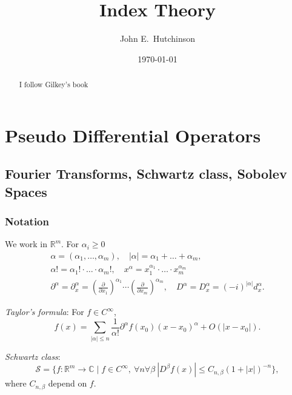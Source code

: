 \documentclass[a4paper]{amsbook}
\theoremstyle{plain}
\theoremstyle{definition}
\theoremstyle{remark}
\begin{document}
\title{Index Theory}  
\author{John E.\ Hutchinson}
\date{\today}

 \begin{abstract}
  I follow Gilkey's book
 \end{abstract}

\maketitle



\tableofcontents

\chapter{Pseudo Differential Operators}
\section{\textbf{Fourier Transforms, Schwartz class, Sobolev Spaces}} 

 \subsection{Notation}  We work in $  \mathbb{R}^m$.  For $ \alpha_i \geq 0 $ 
  \begin{gather*}
  \alpha  = (\alpha_1,\dots, \alpha_m )   , \quad 
  | \alpha |   = \alpha_1+ \dots + \alpha _m, \\ 
  \alpha !  = \alpha _1 ! \cdot \dots\cdot  \alpha _m ! , \quad 
  x^ \alpha  = x_1^{\alpha _1} \cdot \dots \cdot x_m ^ {\alpha _m} \\
  \partial^ \alpha = \partial_x^ \alpha 
     = \left( \frac{\partial}{\partial x_1}\right)^{\alpha_1}\cdots   \left( \frac{\partial}{\partial x_m}\right)^{\alpha_m} , \quad 
D^ \alpha  = D^ \alpha _x = (-i)^{| \alpha | }  d^ \alpha _x .
\end{gather*}
 
 \emph{Taylor's formula}: For $ f \in C^\infty $,
 \[
 f(x) = \sum_{|\alpha   |\leq n} \frac{1}{ \alpha !} \partial^ \alpha f(x_0) (x-x_0)^ \alpha + O(|x-x_0|).
 \]
 
 \emph{Schwartz class}: 
 \[
  \mathcal{S} = \{ f: \mathbb{R}^m \to \mathbb{C} \mid f \in C^\infty , \  \forall n  \forall \beta \ | D^\beta  f(x) | \leq C_{n, \beta }(1+ |x|)^{-n}\},
  \]
  where $ C_{n, \beta } $ depend on $ f $.
  
\end{document}
